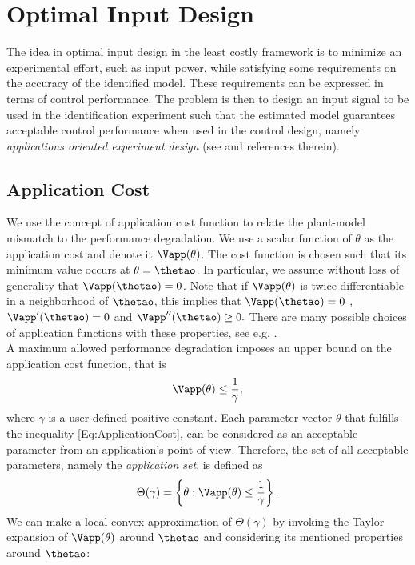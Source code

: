 \documentclass{ifacconf}
\begin{document}
\section{Optimal Input Design}
\label{Sec:Optimal Input Design}
The idea in optimal input design in the least costly framework is to minimize an experimental effort, such as input power, while satisfying some requirements on the accuracy of the identified model. These requirements can be expressed in terms of control performance. The problem is then to design an input signal to be used in the identification experiment such that the estimated model guarantees acceptable control performance when used in the control design, namely \emph{applications oriented experiment design} (see \cite{Bombois&Gilson:06SYSID} and references therein). 
\subsection{Application Cost}
We use the concept of application cost function to relate the plant-model mismatch to the performance degradation. We use a scalar function of $\theta$ as the application cost and denote it $\Vapp(\theta)$.
The cost function is chosen such that its minimum value occurs at $\theta = \thetao$. In particular, we assume without loss of generality that $\Vapp(\thetao) = 0$. Note that if $\Vapp(\theta)$ is twice differentiable in a neighborhood of $\thetao$, this implies that
$\Vapp(\thetao) = 0$ , $\Vapp'(\thetao) = 0$ and $\Vapp''(\thetao) \geq 0.$
There are many possible choices of application functions with these properties, see e.g. \cite{Larsson2011a}.
\\
A maximum allowed performance degradation imposes an upper bound on the application cost function, that is
\begin{equation} \label{Eq:ApplicationCost}
	\Vapp(\theta) \leq \frac{1}{\gamma},
\end{equation}
where $\gamma$ is a user-defined positive constant. Each parameter vector $\theta$ that fulfills the inequality \eqref{Eq:ApplicationCost}, can be considered as an acceptable parameter from an application's point of view. Therefore, the set of all acceptable parameters, namely the \emph{application set}, is defined as
\begin{equation}\label{Eq:ApplicationSet}
	\Theta (\gamma) = \left\{ \theta : \Vapp(\theta) \leq \frac{1}{\gamma} \right\}.
\end{equation}
We can make a local convex approximation of $\Theta(\gamma)$ by invoking the Taylor expansion of $\Vapp(\theta)$ around $\thetao$ and considering its mentioned properties around $\thetao$:
\end{document}
